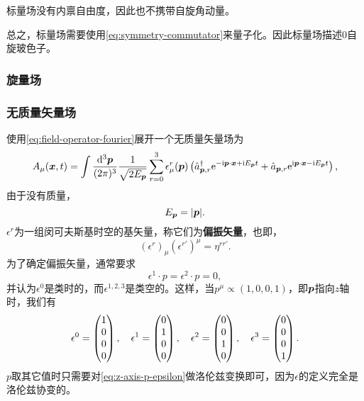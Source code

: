 \documentclass[hyperref, UTF8, a4paper]{ctexart}
\newcommand*{\ii}{\mathrm{i}}
\newcommand*{\ee}{\mathrm{e}}
\begin{document}
标量场没有内禀自由度，因此也不携带自旋角动量。

总之，标量场需要使用\eqref{eq:symmetry-commutator}来量子化。因此标量场描述$0$自旋玻色子。

\subsubsection{旋量场}


\subsubsection{无质量矢量场}

使用\eqref{eq:field-operator-fourier}展开一个无质量矢量场为
\begin{equation}
    A_\mu (\vb*{x}, t) = \int \frac{\dd[3]{\vb*{p}}}{(2\pi)^3} \frac{1}{\sqrt{2 E_{\vb*{p}}}} \sum_{r=0}^3 \epsilon_\mu^r(\vb*{p}) \left(\hat{a}_{\vb*{p}, r}^\dagger \ee^{ - \ii \vb*{p} \cdot \vb*{x} + \ii E_{\vb*{p}} t} + \hat{a}_{\vb*{p}, r} \ee^{ \ii \vb*{p} \cdot \vb*{x} - \ii E_{\vb*{p}} t} \right), 
    \label{eq:expanding-massless-vector-field}
\end{equation}
由于没有质量，
\begin{equation}
    E_{\vb*{p}} = \abs{\vb*{p}}.
\end{equation}
$\epsilon^r$为一组闵可夫斯基时空的基矢量，称它们为\textbf{偏振矢量}，也即，
\begin{equation}
    (\epsilon^r)_\mu (\epsilon^{r'})^\mu = \eta^{r r'}.
\end{equation}
为了确定偏振矢量，通常要求
\begin{equation}
    \epsilon^1 \cdot p = \epsilon^2 \cdot p = 0,
\end{equation}
并认为$\epsilon^0$是类时的，而$\epsilon^{1,2,3}$是类空的。这样，当$p^\mu \propto (1, 0, 0, 1)$，即$\vb*{p}$指向$z$轴时，我们有
\begin{equation}
    \epsilon^0 = \pmqty{1 \\ 0 \\ 0 \\ 0}, \quad \epsilon^1 = \pmqty{0 \\ 1 \\ 0 \\ 0}, \quad \epsilon^2 = \pmqty{0 \\ 0 \\ 1 \\ 0}, \quad \epsilon^3 = \pmqty{0 \\ 0 \\ 0 \\ 1}.
    \label{eq:z-axis-p-epsilon}
\end{equation}
$p$取其它值时只需要对\eqref{eq:z-axis-p-epsilon}做洛伦兹变换即可，因为$\epsilon$的定义完全是洛伦兹协变的。
\end{document}
